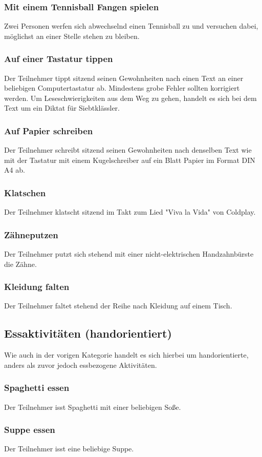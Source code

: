 \subsubsection{Mit einem Tennisball Fangen spielen}
Zwei Personen werfen sich abwechselnd einen Tennisball zu und versuchen dabei, möglichst an einer Stelle stehen zu bleiben.
\subsubsection{Auf einer Tastatur tippen}
Der Teilnehmer tippt sitzend seinen Gewohnheiten nach einen Text an einer beliebigen Computertastatur ab. Mindestens grobe Fehler sollten korrigiert werden. Um Leseschwierigkeiten aus dem Weg zu gehen, handelt es sich bei dem Text um ein Diktat für Siebtklässler.
\subsubsection{Auf Papier schreiben}
Der Teilnehmer schreibt sitzend seinen Gewohnheiten nach denselben Text wie mit der Tastatur mit einem Kugelschreiber auf ein Blatt Papier im Format DIN A4 ab.
\subsubsection{Klatschen}
Der Teilnehmer klatscht sitzend im Takt zum Lied "Viva la Vida" von Coldplay.
\subsubsection{Zähneputzen}
Der Teilnehmer putzt sich stehend mit einer nicht-elektrischen Handzahnbürste die Zähne.
\subsubsection{Kleidung falten}
Der Teilnehmer faltet stehend der Reihe nach Kleidung auf einem Tisch.

\subsection*{Essaktivitäten (handorientiert)}
Wie auch in der vorigen Kategorie handelt es sich hierbei um handorientierte, anders als zuvor jedoch essbezogene Aktivitäten.
\subsubsection{Spaghetti essen}
Der Teilnehmer isst Spaghetti mit einer beliebigen Soße.
\subsubsection{Suppe essen}
Der Teilnehmer isst eine beliebige Suppe.
